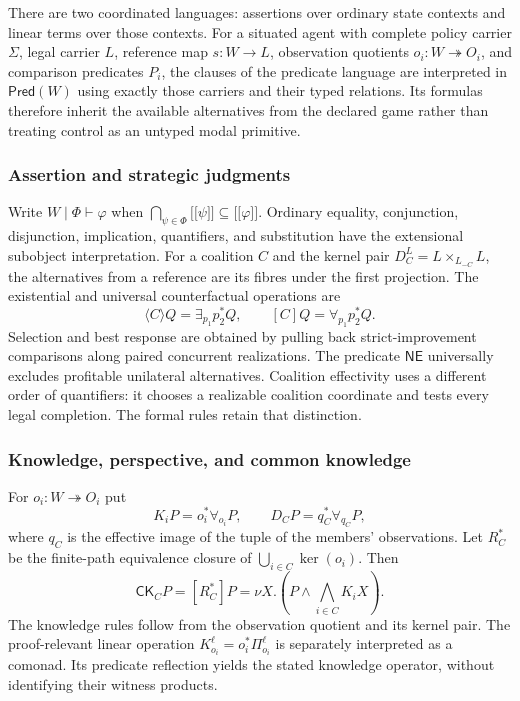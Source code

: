 \documentclass[11pt,a4paper]{article}
\numberwithin{equation}{section}
\theoremstyle{definition}
\theoremstyle{remark}
\theoremstyle{plain}
\providecommand{\llbracket}{\mathopen{[\![}}
\providecommand{\rrbracket}{\mathclose{]\!]}}
\begin{document}
There are two coordinated languages: assertions over ordinary
state contexts and linear terms over those contexts. For a situated
agent with complete policy carrier $\Sigma$, legal carrier $L$,
reference map $s:W\to L$, observation quotients
$o_i:W\twoheadrightarrow O_i$, and comparison predicates $P_i$, the
clauses of the predicate language are interpreted in $\mathsf{Pred}(W)$ using exactly those carriers
and their typed relations. Its formulas therefore inherit the available alternatives
from the declared game rather than treating control as an untyped
modal primitive.

\subsubsection{Assertion and strategic judgments}
Write $W\mid\Phi\vdash\varphi$ when
$\bigcap_{\psi\in\Phi}\llbracket\psi\rrbracket\subseteq
\llbracket\varphi\rrbracket$.  Ordinary equality, conjunction,
disjunction, implication, quantifiers, and substitution have the extensional
subobject interpretation.  For a coalition $C$ and the kernel pair
$D_C^L=L\times_{L_{-C}}L$, the alternatives from a reference are its
fibres under the first projection.  The existential and universal
counterfactual operations are
\[
\langle C\rangle Q=\exists_{p_1}p_2^*Q,
\qquad
[C]Q=\forall_{p_1}p_2^*Q.
\]
Selection and best response are obtained by pulling back
strict-improvement comparisons along paired concurrent realizations.
The predicate $\mathsf{NE}$ universally excludes profitable unilateral
alternatives. Coalition effectivity uses a different order of quantifiers:
it chooses a realizable coalition coordinate and tests every legal
completion. The formal rules retain that distinction.

\subsubsection{Knowledge, perspective, and common knowledge}
For $o_i:W\twoheadrightarrow O_i$ put
\[
K_iP=o_i^*\forall_{o_i}P,\qquad
D_CP=q_C^*\forall_{q_C}P,
\]
where $q_C$ is the effective image of the tuple of the members'
observations.  Let $R_C^*$ be the finite-path equivalence closure of
$\bigcup_{i\in C}\ker(o_i)$.  Then
\[
\mathsf{CK}_C P=[R_C^*]P
=\nu X.\left(P\wedge\bigwedge_{i\in C}K_iX\right).
\]
The knowledge rules follow from the observation quotient and its
kernel pair. The proof-relevant linear operation
$K_{o_i}^{\ell}=o_i^*\Pi_{o_i}^{\ell}$ is separately interpreted
as a comonad. Its predicate reflection yields the stated knowledge
operator, without identifying their witness products.
\end{document}
